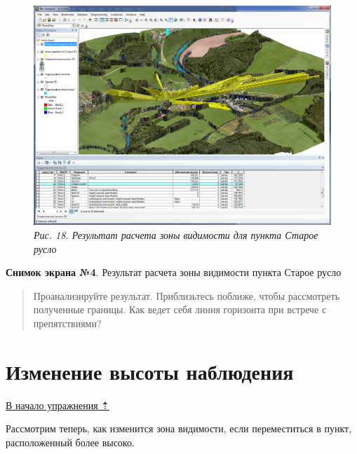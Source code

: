 \documentclass[]{book}
\theoremstyle{definition}
\theoremstyle{definition}
\theoremstyle{definition}
\theoremstyle{remark}
\begin{document}
\begin{enumerate}
  \begin{figure}
  \centering
  \includegraphics{images/Ex18/image20.png}
  \caption{\emph{Рис. 18. Результат расчета зоны видимости для пункта
  Старое русло}}
  \end{figure}

  \textbf{Снимок экрана №4}. Результат расчета зоны видимости пункта
  Старое русло
\end{enumerate}

\begin{quote}
Проанализируйте результат. Приблизьтесь поближе, чтобы рассмотреть
полученные границы. Как ведет себя линия горизонта при встрече с
препятствиями?
\end{quote}

\hypertarget{threed-modelling-height}{%
\section{Изменение высоты наблюдения}\label{threed-modelling-height}}

\protect\hyperlink{three-modelling}{В начало упражнения ⇡}

Рассмотрим теперь, как изменится зона видимости, если переместиться в
пункт, расположенный более высоко.
\end{document}
